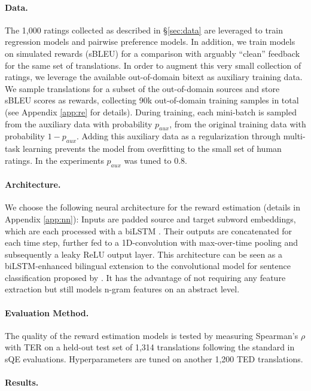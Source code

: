 \paragraph{Data.}
The 1,000 ratings collected as described in §\ref{sec:data} are leveraged to train regression models and pairwise preference models. In addition, we train models on simulated rewards (sBLEU) for a comparison with arguably ``clean'' feedback for the same set of translations. In order to augment this very small collection of ratings, we leverage the available out-of-domain bitext as auxiliary training data. We sample translations for a subset of the out-of-domain sources and store sBLEU scores as rewards, collecting 90k out-of-domain training samples in total (see Appendix \ref{app:re} for details). During training, each mini-batch is sampled from the auxiliary data with probability $p_{aux}$, from the original training data with probability $1-p_{aux}$. Adding this auxiliary data as a regularization through multi-task learning prevents the model from overfitting to the small set of human ratings. In the experiments $p_{aux}$ was tuned to 0.8.

\paragraph{Architecture.}
We choose the following neural architecture for the reward estimation (details in Appendix \ref{app:nn}): Inputs are padded source and target subword embeddings, which are each processed with a biLSTM \cite{HochreiterSchmidhuber:97}. Their outputs are concatenated for each time step, further fed to a 1D-convolution with max-over-time pooling and subsequently a leaky ReLU \cite{MaasETAL:13} output layer. This architecture can be seen as a biLSTM-enhanced bilingual extension to the convolutional model for sentence classification proposed by \citet{Kim:14}. It has the advantage of not requiring any feature extraction but still models n-gram features on an abstract level.

\paragraph{Evaluation Method.} The quality of the reward estimation models is tested by measuring Spearman's $\rho$ with TER on a held-out test set of 1,314 translations following the standard in sQE evaluations. Hyperparameters are tuned on another 1,200 TED translations. 

\paragraph{Results.}\label{sec:estimation-results}

